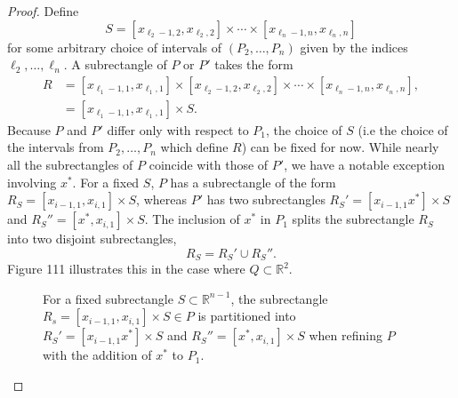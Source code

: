 \documentclass{article}
\newcommand{\R}{\mathbb{R}}
\theoremstyle{definition}
\begin{document}
\begin{proof}
		  Define $$ S = [x_{\ell_2-1,2},x_{\ell_2,2}] \times \cdots \times [x_{\ell_n-1,n},x_{\ell_n,n}]$$ for some arbitrary choice of intervals of $(P_2,\ldots, P_n) $ given by the indices $ \ell_2,\ldots,\ell_n $. A subrectangle of $ P $ or $ P' $ takes the form 
		  \begin{align*}
 R&=[x_{\ell_1-1,1},x_{\ell_1,1}]\times [x_{\ell_2-1,2},x_{\ell_2,2}] \times \cdots \times [x_{\ell_n-1,n},x_{\ell_n,n}],\\ 
 & =[x_{\ell_1-1,1},x_{\ell_1,1}]\times S.
		  \end{align*}
		Because $ P $ and $ P' $ differ only with respect to $ P_1 $, the choice of $ S $ (i.e the choice of the intervals from $ P_2,\ldots, P_n $ which define $ R $) can be fixed for now. While nearly all the subrectangles of $ P $ coincide with those of $ P' $, we have a notable exception involving $ x^* $. For a fixed $ S $,  $ P $ has a subrectangle of the form $ R_S = [x_{i-1,1}, x_{i,1}]\times S $, whereas $ P' $ has two subrectangles $ R_S'=[x_{i-1,1}x^*]\times S$ and $ R_S''=[x^*, x_{i,1}]\times S$. The inclusion of $ x^* $ in $ P_1 $ splits the subrectangle $ R_S $ into two disjoint subrectangles,
		$$R_S = R_S'\cup R_S'' .$$ Figure 111 illustrates this in the case where $ Q\subset \R^2 $.
		\begin{figure}[h!]
			\centering
			\caption{For a fixed subrectangle $ S\subset \R^{n-1} $, the subrectangle $ R_s = [x_{i-1,1}, x_{i,1}]\times S\in P $ is partitioned into $ R_S'=[x_{i-1,1}x^*]\times S $ and $ R_S''=[x^*, x_{i,1}]\times S$ when refining $ P $ with the addition of $ x^* $ to $ P_1 $.}
		\end{figure}
		

\end{proof}
\end{document}
